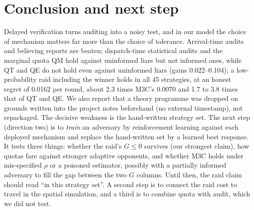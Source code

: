 \documentclass[10pt]{article}
\begin{document}
\section{Conclusion and next step}\label{sec:concl}
Delayed verification turns auditing into a noisy test, and in our model the choice of mechanism matters far more than the choice of tolerance. Arrival-time audits and believing reports are beaten; dispatch-time statistical audits and the marginal quota QM hold against uninformed liars but not informed ones, while QT and QE do not hold even against uninformed liars (gains 0.022--0.104); a low-probability raid including the winner holds in all 45 strategies, at an honest regret of 0.0162 per round, about 2.3 times M3C's 0.0070 and 1.7 to 3.8 times that of QT and QE. We also report that a theory programme was dropped on grounds written into the project notes beforehand (no external timestamp), not repackaged. The decisive weakness is the hand-written strategy set. The next step (direction two) is to \emph{train} an adversary by reinforcement learning against each deployed mechanism and replace the hand-written set by a learned best response. It tests three things: whether the raid's $G\le0$ survives (our strongest claim), how quotas fare against stronger adaptive opponents, and whether M3C holds under mis-specified $\rho$ or a poisoned estimator, possibly with a partially informed adversary to fill the gap between the two $G$ columns. Until then, the raid claim should read ``in this strategy set''. A second step is to connect the raid cost to travel in the spatial simulation, and a third is to combine quota with audit, which we did not test.



\end{document}
